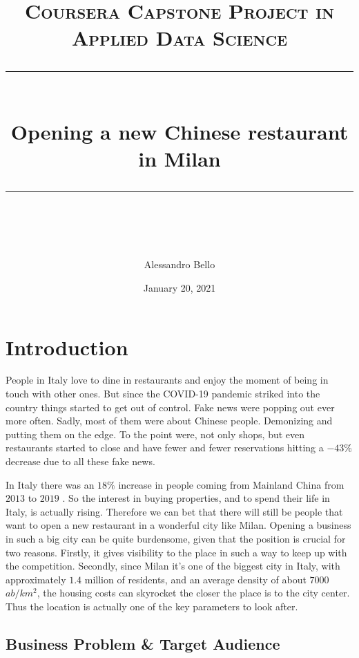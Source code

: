 \documentclass[12pt]{article} %
\title{
\normalfont \normalsize 
\textsc{Coursera Capstone Project in Applied Data Science} \\
[10pt] 
\rule{\linewidth}{0.5pt} \\[6pt] 
\huge Opening a new Chinese restaurant in Milan \\
\rule{\linewidth}{2pt}  \\[10pt]
}
\author{Alessandro Bello}
\date{\normalsize January 20, 2021}
\newcounter{other}
\begin{document}
\maketitle
\noindent





%
%
%
%
\tableofcontents
\newpage

\section{Introduction}
 
People in Italy love to dine in restaurants and enjoy the moment of being in touch with other ones. But since the COVID-19 pandemic striked into the country things started to get out of control. Fake news were popping out ever more often. Sadly, most of them were about Chinese people. Demonizing and putting them on the edge. To the point were, not only shops, but even restaurants started to close \cite{-2:cr} and have fewer and fewer reservations \cite{-1:cr} hitting a $-43\%$ decrease due to all these fake news.

In Italy there was an $18 \%$ increase in people coming from Mainland China from $2013$ to $2019$ \cite{0:cp}. So the interest in buying properties, and to spend their life in Italy, is actually rising. Therefore we can bet that there will still be people that want to open a new restaurant in a wonderful city like Milan. Opening a business in such a big city can be quite burdensome, given that the position is crucial for two reasons. Firstly, it gives visibility to the place in such a way to keep up with the competition. Secondly, since Milan it's one of the biggest city in Italy, with approximately $ 1.4 $ million of residents, and an average density of about $7000$ $ab/km^{2}$, the housing costs can skyrocket the closer the place is to the city center. Thus the location is actually one of the key parameters to look after.

\subsection{Business Problem \& Target Audience}
\end{document}
